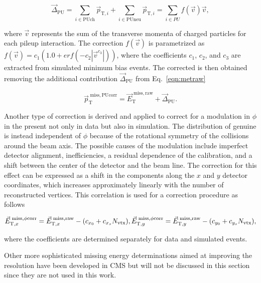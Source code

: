 \begin{equation}
{\vec \Delta}_\mathrm{PU} = \sum_{i \in \mathrm{PUch}} {\vec p}_{\mathrm{T},i} + \sum_{i \in \mathrm{PUneu}} {\vec p}_{\mathrm{T},i} = \sum_{i \in PU} f({\vec v}) {\vec v},
\end{equation}

where ${\vec v}$ represents the sum of the transverse momenta of charged particles for each pileup interaction.
The correction $f({\vec v})$ is parametrized as $f({\vec v}) = c_1 (1.0 +erf(-c_2|{\vec v}^{c_3}|))$, where the coefficients $c_1$, $c_2$, and $c_3$ are extracted from simulated minimum bias events.
The corrected \ptvecmiss is then obtained removing the additional contribution ${\vec \Delta}_\mathrm{PU}$ from Eq.~\ref{eqn:metraw}

\begin{equation}
{\vec p}_\mathrm{T}^\mathrm{\; miss,PUcorr} = {\vec E}_\mathrm{T}^\mathrm{\; miss,raw} + {\vec \Delta}_\mathrm{PU}.
\end{equation}

Another type of correction is derived and applied to correct for a modulation in $\phi$ in the \ptvecmiss present not only in data but also in simulation. The distribution of genuine \ptvecmiss is instead independent of $\phi$ because of the rotational symmetry of the collisions around the beam axis. The possible causes of the modulation include imperfect detector alignment, inefficiencies, a residual \pt dependence of the calibration, and a shift between the center of the detector and the beam line. The correction for this effect can be expressed as a shift in the \ptvecmiss components along the $x$ and $y$ detector coordinates, which increases approximately linearly with the number of reconstructed vertices. This correlation is used for a correction procedure as follows

\begin{equation}
{\vec E}_{\mathrm{T},x}^\mathrm{\; miss,\phi corr} = {\vec E}_{\mathrm{T},x}^\mathrm{\; miss,raw} - (c_{x_0} + c_{x_s}N_\mathrm{vtx}),\\
{\vec E}_{\mathrm{T},y}^\mathrm{\; miss,\phi corr} = {\vec E}_{\mathrm{T},y}^\mathrm{\; miss,raw} - (c_{y_0} + c_{y_s}N_\mathrm{vtx}),
\end{equation}

where the coefficients are determined separately for data and simulated events.

Other more sophisticated missing energy determinations aimed at improving the resolution have been developed in CMS\cite{Khachatryan:2014gga,CMS-PAS-JME-16-004} but will not be discussed in this section since they are not used in this work.\\


